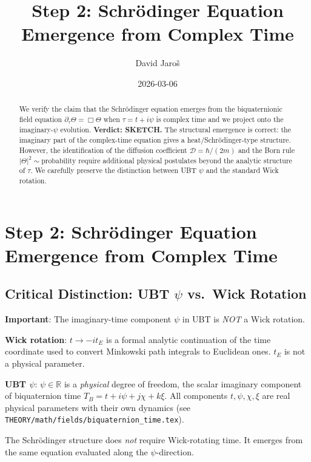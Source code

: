 \documentclass[12pt]{article}
\title{\textbf{Step 2: Schrödinger Equation Emergence from Complex Time}}
\author{David Jaroš}
\date{2026-03-06}
\theoremstyle{definition}
\theoremstyle{remark}
\begin{document}
  \maketitle

  \begin{abstract}
  We verify the claim that the Schrödinger equation emerges from the biquaternionic
  field equation $\partial_\tau\Theta = \Box\Theta$ when $\tau = t + i\psi$ is complex
  time and we project onto the imaginary-$\psi$ evolution.
  \textbf{Verdict: SKETCH.}
  The structural emergence is correct: the imaginary part of the complex-time equation
  gives a heat/Schrödinger-type structure.  However, the identification of the diffusion
  coefficient $\mathcal{D} = \hbar/(2m)$ and the Born rule $|\Theta|^2 \sim \text{probability}$
  require additional physical postulates beyond the analytic structure of $\tau$.
  We carefully preserve the distinction between UBT $\psi$ and the standard Wick rotation.
  \end{abstract}
\fi

\section{Step 2: Schrödinger Equation Emergence from Complex Time}
\label{sec:schrodinger_emergence}

\subsection{Critical Distinction: UBT $\psi$ vs.\ Wick Rotation}

\begin{distinctionbox}
\textbf{Important}: The imaginary-time component $\psi$ in UBT is \emph{NOT} a Wick rotation.

\medskip
\textbf{Wick rotation}: $t \to -it_E$ is a formal analytic continuation of the time
coordinate used to convert Minkowski path integrals to Euclidean ones.
$t_E$ is not a physical parameter.

\medskip
\textbf{UBT $\psi$}: $\psi \in \mathbb{R}$ is a \emph{physical} degree of freedom, the
scalar imaginary component of biquaternion time $T_B = t + i\psi + j\chi + k\xi$.
All components $t, \psi, \chi, \xi$ are real physical parameters with their own dynamics
(see \texttt{THEORY/math/fields/biquaternion\_time.tex}).

\medskip
The Schrödinger structure does \emph{not} require Wick-rotating time.
It emerges from the same equation evaluated along the $\psi$-direction.
\end{distinctionbox}
\end{document}

